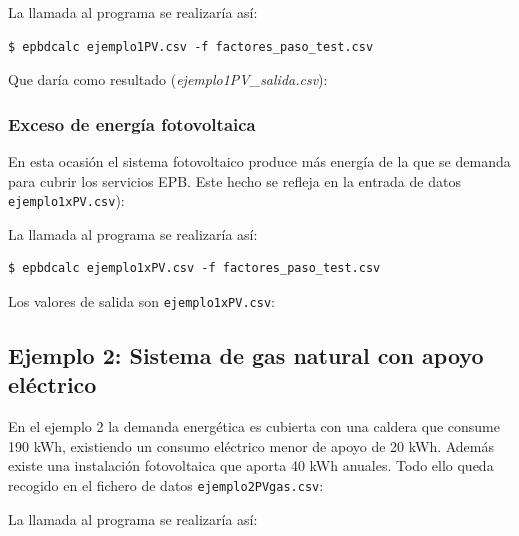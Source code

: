 \documentclass[10pt,notitlepage,oneside,a4paper]{article}
\begin{document}

La llamada al programa se realizaría así:

\begin{Verbatim}[fontsize=\small]
    $ epbdcalc ejemplo1PV.csv -f factores_paso_test.csv
\end{Verbatim}

Que daría como resultado (\textit{ejemplo1PV\_salida.csv}):


\subsubsection{Exceso de energía fotovoltaica}

En esta ocasión el sistema fotovoltaico produce más energía de la que se demanda para cubrir los servicios EPB. Este hecho se refleja en la entrada de datos \texttt{ejemplo1xPV.csv}):


La llamada al programa se realizaría así:

\begin{Verbatim}[fontsize=\small]
    $ epbdcalc ejemplo1xPV.csv -f factores_paso_test.csv
\end{Verbatim}

Los valores de salida son \texttt{ejemplo1xPV.csv}:


\subsection{Ejemplo 2: Sistema de gas natural con apoyo eléctrico}
En el ejemplo 2 la demanda energética es cubierta con una caldera que consume 190 kWh, existiendo un consumo eléctrico menor de apoyo de 20 kWh. Además existe una instalación fotovoltaica que aporta 40 kWh anuales. Todo ello queda recogido en el fichero de datos \texttt{ejemplo2PVgas.csv}:


La llamada al programa se realizaría así:
\end{document}
